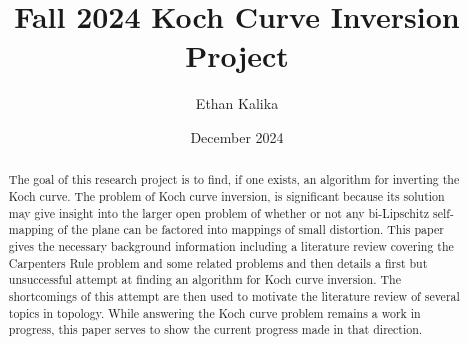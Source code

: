\documentclass{article}
\title{Fall 2024 Koch Curve Inversion Project}
\author{Ethan Kalika}
\date{December 2024}
\theoremstyle{definition}
\begin{document}
\maketitle
\begin{abstract}
    The goal of this research project is to find, if one exists, an algorithm for inverting the Koch curve. The problem of Koch curve inversion, is significant because its solution may give insight into the larger open problem of whether or not any bi-Lipschitz self-mapping of the plane can be factored into mappings of small distortion. This paper gives the necessary background information including a literature review covering the Carpenters Rule problem and some related problems and then details a first but unsuccessful attempt at finding an algorithm for Koch curve inversion. The shortcomings of this attempt are then used to motivate the literature review of several topics in topology. While answering the Koch curve problem remains a work in progress, this paper serves to show the current progress made in that direction.
\end{abstract}
\end{document}
